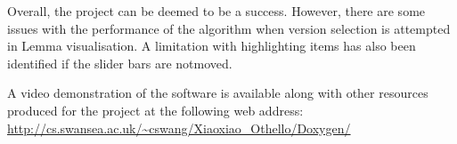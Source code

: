 Overall, the project can be deemed to be a success. However, there are some issues with the performance of the algorithm when version selection is attempted in Lemma visualisation. A limitation with highlighting items has also been identified if the slider bars are notmoved.

A video demonstration of the software is available along with other resources produced for the project at the following web address: \url{http://cs.swansea.ac.uk/~cswang/Xiaoxiao_Othello/Doxygen/}
 


